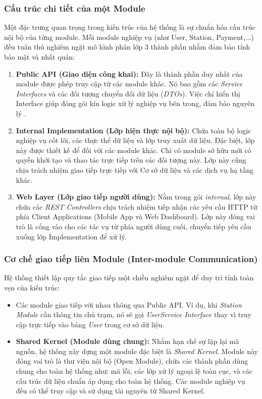 \subsubsection{Cấu trúc chi tiết của một Module}
Một đặc trưng quan trọng trong kiến trúc của hệ thống là sự chuẩn hóa cấu trúc nội bộ của từng module. Mỗi module nghiệp vụ (như User, Station, Payment,...) đều tuân thủ nghiêm ngặt mô hình phân lớp 3 thành phần nhằm đảm bảo tính bảo mật và nhất quán:
\begin{enumerate}
  \item \textbf{Public API (Giao diện công khai):}
    Đây là thành phần duy nhất của module được phép truy cập từ các module khác. Nó bao gồm các \textit{Service Interfaces} và các đối tượng chuyển đổi dữ liệu (\textit{DTOs}). Việc chỉ hiển thị Interface giúp đóng gói kín logic xử lý nghiệp vụ bên trong, đảm bảo nguyên lý .
  \item \textbf{Internal Implementation (Lớp hiện thực nội bộ):}
    Chứa toàn bộ logic nghiệp vụ cốt lõi, các thực thể dữ liệu và lớp truy xuất dữ liệu. Đặc biệt, lớp này được thiết kế để  đối với các module khác. Chỉ có module sở hữu mới có quyền khởi tạo và thao tác trực tiếp trên các đối tượng này. Lớp này cũng chịu trách nhiệm giao tiếp trực tiếp với Cơ sở dữ liệu và các dịch vụ hạ tầng khác.
  \item \textbf{Web Layer (Lớp giao tiếp người dùng):}
    Nằm trong gói \textit{internal}, lớp này chứa các \textit{REST Controllers} chịu trách nhiệm tiếp nhận các yêu cầu HTTP từ phía Client Applications (Mobile App và Web Dashboard). Lớp này đóng vai trò là cổng vào cho các tác vụ từ phía người dùng cuối, chuyển tiếp yêu cầu xuống lớp Implementation để xử lý.
\end{enumerate}
\subsubsection{Cơ chế giao tiếp liên Module (Inter-module Communication)}
Hệ thống thiết lập quy tắc giao tiếp một chiều nghiêm ngặt để duy trì tính toàn vẹn của kiến trúc:
\begin{itemize}
  \item Các module giao tiếp với nhau thông qua Public API. Ví dụ, khi \textit{Station Module} cần thông tin chủ trạm, nó sẽ gọi \textit{UserService Interface} thay vì truy cập trực tiếp vào bảng \textit{User} trong cơ sở dữ liệu.
  \item \textbf{Shared Kernel (Module dùng chung):} Nhằm hạn chế sự lặp lại mã nguồn, hệ thống xây dựng một module đặc biệt là \textit{Shared Kernel}. Module này đóng vai trò là thư viện nội bộ (Open Module), chứa các thành phần dùng chung cho toàn hệ thống như: mã lỗi, các lớp xử lý ngoại lệ toàn cục, và các cấu trúc dữ liệu chuẩn áp dụng cho toàn hệ thống. Các module nghiệp vụ đều có thể truy cập và sử dụng tài nguyên từ Shared Kernel.
\end{itemize}
